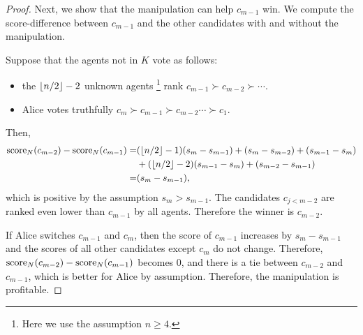 \begin{proof}
Next, we show that the manipulation can help $c_{m-1}$ win. We compute the score-difference between $c_{m-1}$ and the other candidates with and without the manipulation. 

Suppose that the agents not in $K$ vote as follows:
\begin{itemize}
\item the $\left\lfloor n/2 \right\rfloor-2$ unknown agents%
\footnote{Here we use the assumption $n\geq 4$.}
rank $c_{m-1}\succ c_{m-2}\succ \cdots $.
\item Alice votes truthfully $c_m\succ c_{m-1}\succ c_{m-2} \cdots \succ c_1$.
\end{itemize}
Then,
\begin{align*}
\operatorname{score}_N(c_{m-2}) - \operatorname{score}_N(c_{m-1})
=&
(\left\lfloor n/2 \right\rfloor-1)(s_{m}-s_{m-1}) 
+ (s_m-s_{m-2})
+ (s_{m-1}-s_{m})
\\
&+
(\left\lfloor n/2 \right\rfloor-2)(s_{m-1}-s_{m}) 
+ (s_{m-2}-s_{m-1})
\\
=&
(s_{m}-s_{m-1}),
\end{align*}
which is positive by the assumption $s_m>s_{m-1}$.
The candidates $c_{j<m-2}$ are ranked even lower than $c_{m-1}$ by all agents. Therefore the winner is $c_{m-2}$.

If Alice switches $c_{m-1}$ and $c_m$, then the score of $c_{m-1}$ increases by $s_m-s_{m-1}$ and the scores of all other candidates except $c_m$ do not change. Therefore, 
$\operatorname{score}_N(c_{m-2}) - \operatorname{score}_N(c_{m-1})$ becomes $0$, and there is a tie between $c_{m-2}$ and $c_{m-1}$, which is better for Alice by assumption.
Therefore, the manipulation is profitable.


\end{proof}
